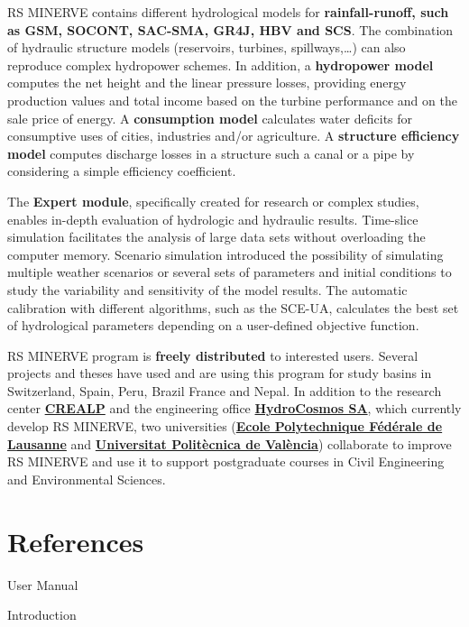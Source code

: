 \documentclass[
  letterpaper,
  DIV=11,
  numbers=noendperiod]{scrreprt}
\begin{document}
RS MINERVE contains different hydrological models for
\textbf{rainfall-runoff, such as GSM, SOCONT, SAC-SMA, GR4J, HBV and
SCS}. The combination of hydraulic structure models (reservoirs,
turbines, spillways,\ldots) can also reproduce complex hydropower
schemes. In addition, a \textbf{hydropower model} computes the net
height and the linear pressure losses, providing energy production
values and total income based on the turbine performance and on the sale
price of energy. A \textbf{consumption model} calculates water deficits
for consumptive uses of cities, industries and/or agriculture. A
\textbf{structure efficiency model} computes discharge losses in a
structure such a canal or a pipe by considering a simple efficiency
coefficient.

The \textbf{Expert module}, specifically created for research or complex
studies, enables in-depth evaluation of hydrologic and hydraulic
results. Time-slice simulation facilitates the analysis of large data
sets without overloading the computer memory. Scenario simulation
introduced the possibility of simulating multiple weather scenarios or
several sets of parameters and initial conditions to study the
variability and sensitivity of the model results. The automatic
calibration with different algorithms, such as the SCE-UA, calculates
the best set of hydrological parameters depending on a user-defined
objective function.

RS MINERVE program is \textbf{freely distributed} to interested users.
Several projects and theses have used and are using this program for
study basins in Switzerland, Spain, Peru, Brazil France and Nepal. In
addition to the research center
\href{https://crealp.ch/}{\textbf{CREALP}} and the engineering office
\href{https://www.hydrocosmos.ch/}{\textbf{HydroCosmos SA}}, which
currently develop RS MINERVE, two universities
(\href{https://www.epfl.ch/en/}{\textbf{Ecole Polytechnique Fédérale de
Lausanne}} and \href{http://www.upv.es/en}{\textbf{Universitat
Politècnica de València}}) collaborate to improve RS MINERVE and use it
to support postgraduate courses in Civil Engineering and Environmental
Sciences.

\hypertarget{references}{%
\chapter*{References}\label{references}}

User Manual

Introduction
\end{document}

